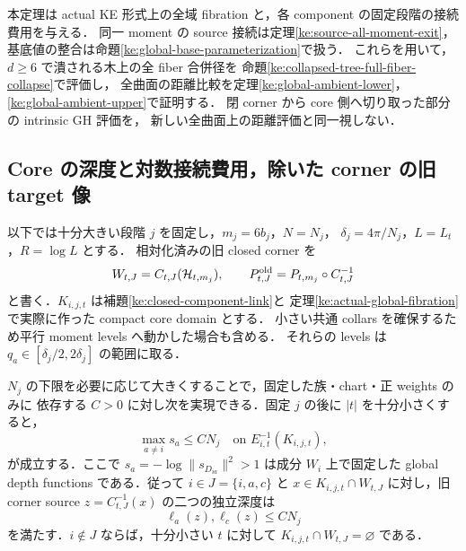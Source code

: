 本定理は actual KE 形式上の全域 fibration と，各 component の固定段階の接続費用を与える．
同一 moment の source 接続は定理\ref{ke:source-all-moment-exit}，
基底値の整合は命題\ref{ke:global-base-parameterization}で扱う．
これらを用いて，$d\ge6$ で潰される木上の全 fiber 合併径を
命題\ref{ke:collapsed-tree-full-fiber-collapse}で評価し，
全曲面の距離比較を定理\ref{ke:global-ambient-lower}，
\ref{ke:global-ambient-upper}で証明する．
閉 corner から core 側へ切り取った部分の intrinsic GH 評価を，
新しい全曲面上の距離評価と同一視しない．

\subsection{Core の深度と対数接続費用，除いた corner の旧 target 像}
\label{ke:core-target-caps-section}

以下では十分大きい段階 $j$ を固定し，$m_j=6b_j$，$N=N_j$，
$\delta_j=4\pi/N_j$，$L=L_t$，$R=\log L$ とする．
相対化済みの旧 closed corner を
\[
 W_{t,J}=C_{t,J}(\mathcal H_{t,m_j}),\qquad
 P^{\rm old}_{t,J}=P_{t,m_j}\circ C_{t,J}^{-1}
\]
と書く．$K_{i,j,t}$ は補題\ref{ke:closed-component-link}と
定理\ref{ke:actual-global-fibration}で実際に作った compact core domain とする．
小さい共通 collars を確保するため平行 moment levels へ動かした場合も含める．
それらの levels は $q_a\in[\delta_j/2,2\delta_j]$ の範囲に取る．

\begin{lemma}
\label{ke:core-depth-upper}
$N_j$ の下限を必要に応じて大きくすることで，固定した族・chart・正 weights のみに
依存する $C>0$ に対し次を実現できる．固定 $j$ の後に $|t|$ を十分小さくすると，
\[
 \max_{a\ne i}s_a\le C N_j
 \quad\text{on }E_{i,t}^{-1}(K_{i,j,t}),
\]
が成立する．ここで $s_a=-\log\|s_{D_{ia}}\|^2>1$ は成分 $W_i$ 上で固定した
global depth functions である．従って $i\in J=\{i,a,c\}$ と
$x\in K_{i,j,t}\cap W_{t,J}$ に対し，旧 corner source
$z=C_{t,J}^{-1}(x)$ の二つの独立深度は
\begin{equation}\label{ke:eq:removed-corner-depth-upper}
 \ell_a(z),\ell_c(z)\le C N_j
\end{equation}
を満たす．$i\notin J$ ならば，十分小さい $t$ に対して
$K_{i,j,t}\cap W_{t,J}=\varnothing$ である．
\end{lemma}

